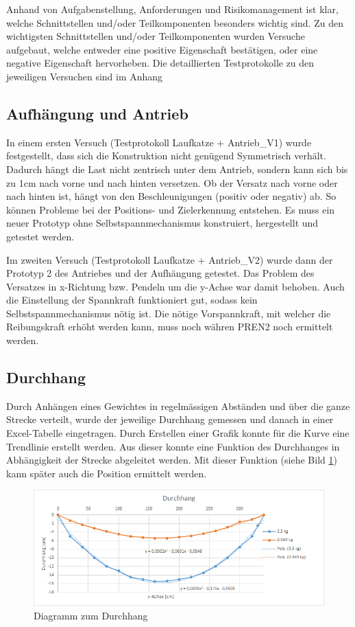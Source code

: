 \documentclass[a4paper]{report}
\begin{document}
Anhand von Aufgabenstellung, Anforderungen und Risikomanagement ist klar, welche Schnittstellen und/oder Teilkomponenten besonders wichtig sind. Zu den wichtigsten Schnittstellen und/oder Teilkomponenten wurden Versuche aufgebaut, welche entweder eine positive Eigenschaft bestätigen, oder eine negative Eigenschaft hervorheben. Die detaillierten Testprotokolle zu den jeweiligen Versuchen sind im Anhang %

\subsection{Aufhängung und Antrieb}
In einem ersten Versuch (Testprotokoll Laufkatze + Antrieb\_V1) wurde festgestellt, dass sich die Konstruktion nicht genügend Symmetrisch verhält. Dadurch hängt die Last nicht zentrisch unter dem Antrieb, sondern kann sich bis zu 1cm nach vorne und nach hinten versetzen. Ob der Versatz nach vorne oder nach hinten ist, hängt von den Beschleunigungen (positiv oder negativ) ab. So können Probleme bei der Positions- und Zielerkennung entstehen.  Es muss ein neuer Prototyp ohne Selbstspannmechanismus konstruiert, hergestellt und getestet werden.

Im zweiten Versuch (Testprotokoll Laufkatze + Antrieb\_V2) wurde dann der Prototyp 2 des Antriebes und der Aufhängung getestet. Das Problem des Versatzes in x-Richtung bzw. Pendeln um die y-Achse war damit behoben. Auch die Einstellung der Spannkraft funktioniert gut, sodass kein Selbstspannmechanismus nötig ist. Die nötige Vorspannkraft, mit welcher die Reibungskraft erhöht werden kann, muss noch währen PREN2 noch ermittelt werden.

\subsection{Durchhang}
\label{ssec:VersDurch}
Durch Anhängen eines Gewichtes in regelmässigen Abständen und über die ganze Strecke verteilt, wurde der jeweilige Durchhang gemessen und danach in einer Excel-Tabelle eingetragen. Durch Erstellen einer Grafik konnte für die Kurve eine Trendlinie erstellt werden. Aus dieser konnte eine Funktion des Durchhanges in Abhängigkeit der Strecke abgeleitet werden. Mit dieser Funktion (siehe Bild \ref{fig:Durchhang_v1}) kann später auch die Position ermittelt werden.
\begin{figure}[h!]
	\centering
	\includegraphics[width=\textwidth,keepaspectratio]{Durchhang_v1}
	\caption{Diagramm zum Durchhang}
	\label{fig:Durchhang_v1}
\end{figure}
\end{document}
